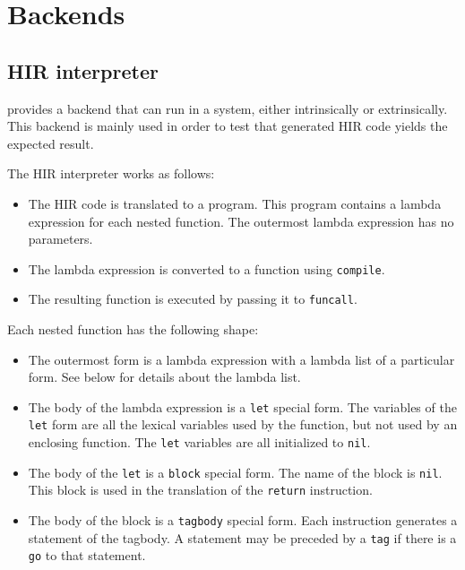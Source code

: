 \chapter{Backends}

\section{HIR interpreter}

\sysname{} provides a backend that can run in a \commonlisp{} system,
either intrinsically or extrinsically.  This backend is mainly used
in order to test that generated HIR code yields the expected result. 

The HIR interpreter works as follows:

\begin{itemize}
\item The HIR code is translated to a \commonlisp{} program.  This
  program contains a lambda expression for each nested function.  The
  outermost lambda expression has no parameters.
\item The lambda expression is converted to a function using
  \texttt{compile}. 
\item The resulting function is executed by passing it to
  \texttt{funcall}. 
\end{itemize}

Each nested function has the following shape:

\begin{itemize}
\item The outermost form is a lambda expression with a lambda list of
  a particular form.  See below for details about the lambda list.
\item The body of the lambda expression is a \texttt{let} special
  form.  The variables of the \texttt{let} form are all the lexical
  variables used by the function, but not used by an enclosing
  function.  The \texttt{let} variables are all initialized to
  \texttt{nil}. 
\item The body of the \texttt{let} is a \texttt{block} special form.
  The name of the block is \texttt{nil}.  This block is used in the
  translation of the \texttt{return} instruction.  
\item The body of the block is a \texttt{tagbody} special form.  Each
  instruction generates a statement of the tagbody.  A statement may
  be preceded by a \texttt{tag} if there is a \texttt{go} to that
  statement. 
\end{itemize}

